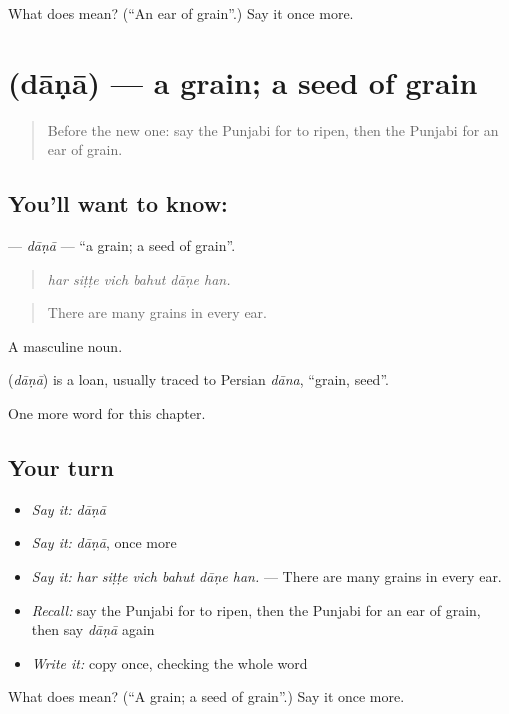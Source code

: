 \begin{tcolorbox}[breakable,colback=teal!4,colframe=teal!35!black,title={Before you move on}]
What does  mean? (\textquotedblleft{}An ear of grain\textquotedblright{}.) Say it once more.
\end{tcolorbox}
\section[\texorpdfstring{\pa{ਦਾਣਾ} (dāṇā)}{ਦਾਣਾ (dāṇā)}]{ (dāṇā) — a grain; a seed of grain}

\label{lesson:PA-C304-dana}



\begin{quote}
Before the new one: say the Punjabi for to ripen, then the Punjabi for an ear of grain.
\end{quote}

\subsection*{You'll want to know: }
\textbf{} — \emph{dāṇā} — \textquotedblleft{}a grain; a seed of grain\textquotedblright{}.

\begin{quote}
     
\end{quote}

\begin{quote}
\emph{har siṭṭe vich bahut dāṇe han.}
\end{quote}

\begin{quote}
There are many grains in every ear.
\end{quote}

A masculine noun.

\begin{cousinweb}
\textbf{} (\emph{dāṇā}) is a loan, usually traced to Persian \emph{dāna}, \textquotedblleft{}grain, seed\textquotedblright{}.
\end{cousinweb}

\begin{grammarlens}[title={What you've built}]
One more word for this chapter.
\end{grammarlens}

\subsection*{Your turn}
\begin{itemize}
\raggedright
  \item \emph{Say it:} \emph{dāṇā}
  \item \emph{Say it:} \emph{dāṇā}, once more
  \item \emph{Say it:} \emph{har siṭṭe vich bahut dāṇe han.} — There are many grains in every ear.
  \item \emph{Recall:} say the Punjabi for to ripen, then the Punjabi for an ear of grain, then say \emph{dāṇā} again
  \item \emph{Write it:} copy \textbf{} once, checking the whole word
\end{itemize}

\begin{tcolorbox}[breakable,colback=teal!4,colframe=teal!35!black,title={Before you move on}]
What does  mean? (\textquotedblleft{}A grain; a seed of grain\textquotedblright{}.) Say it once more.
\end{tcolorbox}
